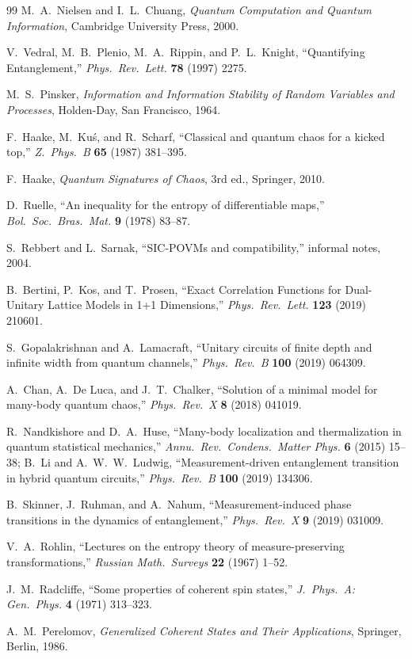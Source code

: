 \documentclass[12pt,a4paper]{article}
\begin{document}
\begin{thebibliography}{99}
  M.~A.~Nielsen and I.~L.~Chuang,
  \emph{Quantum Computation and Quantum Information},
  Cambridge University Press, 2000.

  V.~Vedral, M.~B.~Plenio, M.~A.~Rippin, and P.~L.~Knight,
  ``Quantifying Entanglement,''
  \emph{Phys.\ Rev.\ Lett.} \textbf{78} (1997) 2275.

  M.~S.~Pinsker,
  \emph{Information and Information Stability of Random Variables and Processes},
  Holden-Day, San Francisco, 1964.

  F.~Haake, M.~Ku\'s, and R.~Scharf,
  ``Classical and quantum chaos for a kicked top,''
  \emph{Z.\ Phys.\ B} \textbf{65} (1987) 381--395.

  F.~Haake,
  \emph{Quantum Signatures of Chaos},
  3rd ed., Springer, 2010.

  D.~Ruelle,
  ``An inequality for the entropy of differentiable maps,''
  \emph{Bol.\ Soc.\ Bras.\ Mat.} \textbf{9} (1978) 83--87.

  S.~Rebbert and L.~Sarnak,
  ``SIC-POVMs and compatibility,'' informal notes, 2004.

  B.~Bertini, P.~Kos, and T.~Prosen,
  ``Exact Correlation Functions for Dual-Unitary Lattice Models in 1+1 Dimensions,''
  \emph{Phys.\ Rev.\ Lett.} \textbf{123} (2019) 210601.

  S.~Gopalakrishnan and A.~Lamacraft,
  ``Unitary circuits of finite depth and infinite width from quantum channels,''
  \emph{Phys.\ Rev.\ B} \textbf{100} (2019) 064309.

  A.~Chan, A.~De Luca, and J.~T.~Chalker,
  ``Solution of a minimal model for many-body quantum chaos,''
  \emph{Phys.\ Rev.\ X} \textbf{8} (2018) 041019.

  R.~Nandkishore and D.~A.~Huse,
  ``Many-body localization and thermalization in quantum statistical mechanics,''
  \emph{Annu.\ Rev.\ Condens.\ Matter Phys.} \textbf{6} (2015) 15--38;
  B.~Li and A.~W.~W.~Ludwig,
  ``Measurement-driven entanglement transition in hybrid quantum circuits,''
  \emph{Phys.\ Rev.\ B} \textbf{100} (2019) 134306.

  B.~Skinner, J.~Ruhman, and A.~Nahum,
  ``Measurement-induced phase transitions in the dynamics of entanglement,''
  \emph{Phys.\ Rev.\ X} \textbf{9} (2019) 031009.

  V.~A.~Rohlin,
  ``Lectures on the entropy theory of measure-preserving transformations,''
  \emph{Russian Math.\ Surveys} \textbf{22} (1967) 1--52.

  J.~M.~Radcliffe,
  ``Some properties of coherent spin states,''
  \emph{J.\ Phys.\ A: Gen.\ Phys.} \textbf{4} (1971) 313--323.

  A.~M.~Perelomov,
  \emph{Generalized Coherent States and Their Applications},
  Springer, Berlin, 1986.
\end{thebibliography}
\end{document}
